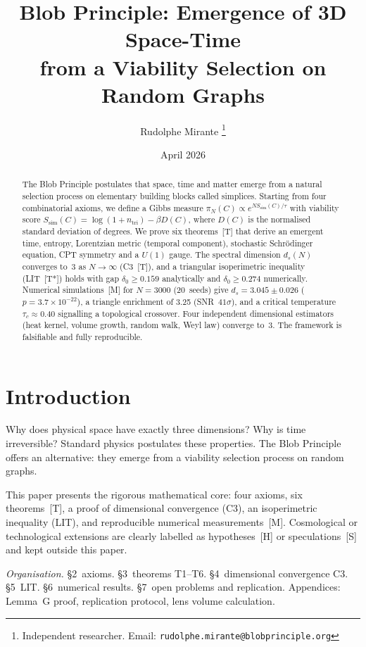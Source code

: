 \documentclass[11pt, a4paper]{article}
\title{Blob Principle: Emergence of 3D Space-Time\\
       from a Viability Selection on Random Graphs}
\author{Rudolphe Mirante%
  \thanks{Independent researcher.
    Email: \texttt{rudolphe.mirante@blobprinciple.org}}}
\date{April 2026}
\begin{document}
\maketitle

\begin{abstract}
The Blob Principle postulates that space, time and matter emerge from a
natural selection process on elementary building blocks called simplices.
Starting from four combinatorial axioms, we define a Gibbs measure
$\pi_N(C)\propto e^{NS_{\text{sim}}(C)/\tau}$ with viability score
$S_{\text{sim}}(C)=\log(1+n_{\text{tri}})-\beta D(C)$,
where $D(C)$ is the normalised standard deviation of degrees.
We prove six theorems~[T] that derive an emergent time, entropy,
Lorentzian metric (temporal component), stochastic Schr\"odinger equation,
CPT symmetry and a $U(1)$ gauge.
The spectral dimension $d_s(N)$ converges to~3 as $N\to\infty$ (C3~[T]),
and a triangular isoperimetric inequality (LIT~[T*]) holds
with gap $\delta_0\ge0.159$ analytically and $\delta_0\ge0.274$ numerically.
Numerical simulations~[M] for $N=3000$ (20~seeds) give
$d_s=3.045\pm0.026$ ($p=3.7\times10^{-22}$), a triangle enrichment of 3.25
(SNR~$41\sigma$), and a critical temperature $\tau_c\approx0.40$
signalling a topological crossover.
Four independent dimensional estimators (heat kernel, volume growth,
random walk, Weyl law) converge to~3.
The framework is falsifiable and fully reproducible.
\end{abstract}

\section{Introduction}

Why does physical space have exactly three dimensions?
Why is time irreversible?
Standard physics postulates these properties.
The Blob Principle offers an alternative: they emerge from a viability
selection process on random graphs.

This paper presents the rigorous mathematical core:
four axioms, six theorems~[T],
a proof of dimensional convergence (C3), an isoperimetric inequality (LIT),
and reproducible numerical measurements~[M].
Cosmological or technological extensions are clearly labelled as
hypotheses~[H] or speculations~[S] and kept outside this paper.

\textit{Organisation.}
\S2~axioms. \S3~theorems T1--T6. \S4~dimensional convergence C3. \S5~LIT.
\S6~numerical results. \S7~open problems and replication.
Appendices: Lemma~G proof, replication protocol, lens volume calculation.
\end{document}
